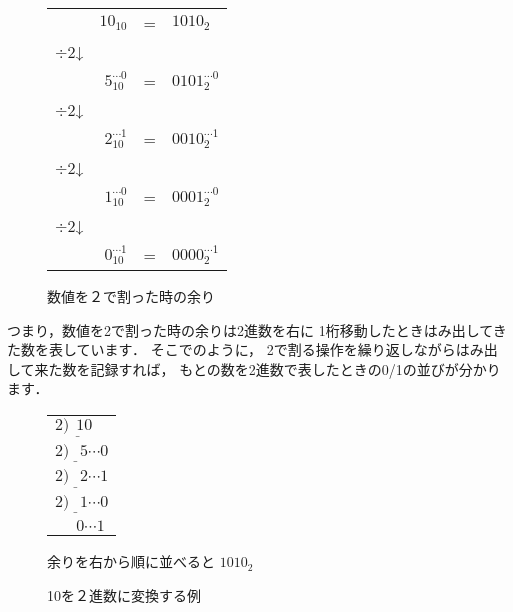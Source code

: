 \begin{figure}[tb]
\begin{center}{\small
\begin{tabular}{l r l l }
          & $10_{10}$ & = & $1010_2$                       \\
$\div 2$↓ &                   &                            \\
          & $5_{10}^{\cdots 0}$  & = & $0101_2^{\cdots 0}$ \\
$\div 2$↓ &                    &                           \\
          & $2_{10}^{\cdots 1}$  & = & $0010_2^{\cdots 1}$ \\
$\div 2$↓ &                    &                           \\
          & $1_{10}^{\cdots 0}$  & = & $0001_2^{\cdots 0}$ \\
$\div 2$↓ &                    &                           \\
          & $0_{10}^{\cdots 1}$  & = & $0000_2^{\cdots 1}$ \\
\end{tabular}}
\caption{数値を２で割った時の余り}
\label{fig:chap2:mod2}
\end{center}
\end{figure}

つまり，数値を2で割った時の余りは2進数を右に
1桁移動したときはみ出してきた数を表しています．
そこでのように，
2で割る操作を繰り返しながらはみ出して来た数を記録すれば，
もとの数を2進数で表したときの0/1の並びが分かります．

\begin{figure}[tb]
\begin{center}{\small
\begin{minipage}{0.5\columnwidth}
\begin{flushright}
\begin{tabular}{l}
$2 \underline{) ~~10 } $\\
$2 \underline{) ~~~5  } {\cdots 0}$ \\
$2 \underline{) ~~~2  } {\cdots 1}$ \\
$2 \underline{) ~~~1  } {\cdots 0}$ \\
$~~            ~~~~0    {\cdots 1}$
\end{tabular}
\end{flushright}
\end{minipage}
\begin{minipage}{0.4\columnwidth}
余りを右から順に並べると $1010_2$
\end{minipage}}
\caption{10を２進数に変換する例}
\label{fig:chap2:decToBin}
\end{center}
\end{figure}

